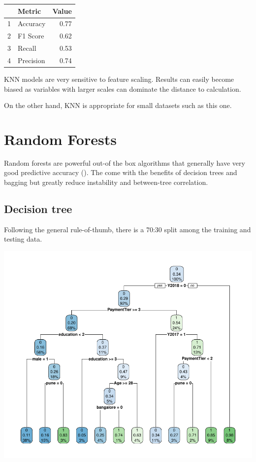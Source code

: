 \documentclass[11pt,preprint, authoryear]{elsarticle}
\let\origtable\table
\let\endorigtable\endtable
\renewenvironment{table}[1][2] {
    \expandafter\origtable\expandafter[H]
} {
    \endorigtable
}
\numberwithin{equation}{section}
\numberwithin{figure}{section}
\numberwithin{table}{section}
\begin{document}
\begin{table}[H]
\centering
\begin{tabular}{rlr}
  \hline
 & Metric & Value \\ 
  \hline
1 & Accuracy & 0.77 \\ 
  2 & F1 Score & 0.62 \\ 
  3 & Recall & 0.53 \\ 
  4 & Precision & 0.74 \\ 
   \hline
\end{tabular}
\caption{Metrics for KNN \label{tab1}} 
\end{table}

KNN models are very sensitive to feature scaling. Results can easily
become biased as variables with larger scales can dominate the distance
to calculation.

On the other hand, KNN is appropriate for small datasets such as this
one.

\hypertarget{random-forests}{%
\section*{Random Forests}\label{random-forests}}

Random forests are powerful out-of the box algorithms that generally
have very good predictive accuracy (). The come with the benefits of
decision trees and bagging but greatly reduce instability and
between-tree correlation.

\hypertarget{decision-tree}{%
\subsection*{Decision tree}\label{decision-tree}}

Following the general rule-of-thumb, there is a 70:30 split among the
training and testing data.

\includegraphics{Final_project_files/figure-latex/unnamed-chunk-11-1.pdf}
\end{document}
